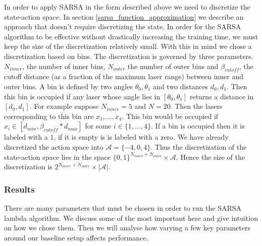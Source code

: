\documentclass{article}
\begin{document}
In order to apply SARSA in the form described above we need to discretize the state-action space. In section \ref{sarsa_function_approximation} we describe an approach that doesn't require discretizing the state. In order for the SARSA algorithm to be effective without drastically increasing the training time, we must keep the size of the discretization relatively small. With this in mind we chose a discretization based on bins. The discretization is governed by three parameters. $N_{inner}$, the number of inner bins, $N_{outer}$ the number of outer bins and $\beta_{cutoff}$, the cutoff distance (as a fraction of the maximum laser range) between inner and outer bins. A bin is defined by two angles $\theta_0, \theta_1$ and two distances $d_0, d_1$. Then this bin is occupied if any laser whose angle lies in $[\theta_0,\theta_1]$ returns a distance in $[d_0,d_1]$. For example suppose $N_{inner} = 5$ and $N = 20$. Then the lasers corresponding to this bin are $x_1,\ldots,x_4$. This bin would be occupied if $x_i \in [d_{min}, \beta_{cutoff}*d_{max}]$ for some $i \in \{1,\ldots,4\}$. If a bin is occupied then it is labeled with a $1$, if it is empty is is labeled with a zero. We have already discretized the action space into $\mathcal{A} = \{-4,0,4\}$. Thus the discretization of the state-action space lies in the space $\{0,1\}^{N_{inner} + N_{outer}} \times \mathcal{A}$. Hence the size of the discretization is $2^{N_{inner} + N_{outer}} \times |\mathcal{A}|$.




\subsubsection{Results}

There are many parameters that must be chosen in order to run the SARSA lambda algorithm. We discuss some of the most important here and give intuition on how we chose them. Then we will analyse how varying a few key parameters around our baseline setup affects performance. 
\end{document}
